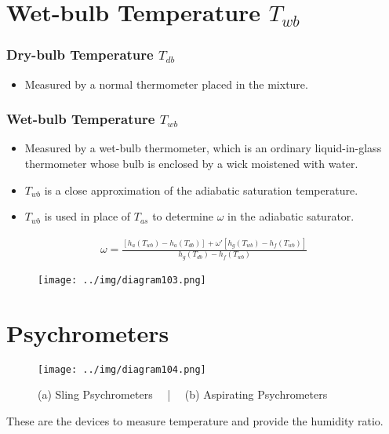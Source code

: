 \documentclass[class=report, crop=false, 12pt,a4paper]{standalone}
\numberwithin{equation}{section}
\begin{document}
\section{Wet-bulb Temperature $T_{wb}$}
\subsubsection{Dry-bulb Temperature $T_{db}$}
\begin{itemize}[noitemsep]
  \item Measured by a normal thermometer placed in the mixture.
\end{itemize}
\subsubsection{Wet-bulb Temperature $T_{wb}$}
\begin{itemize}[noitemsep]
  \item Measured by a wet-bulb thermometer, which is an ordinary liquid-in-glass thermometer whose bulb is enclosed by a wick moistened with water.
  \item $T_{wb}$ is a close approximation of the adiabatic saturation temperature.
  \item $T_{wb}$ is used in place of $T_{as}$ to determine $\omega$ in the adiabatic saturator.
\end{itemize}
\begin{gather}
  \omega = \frac{[h_a(T_{wb}) - h_a(T_{db})] + \omega'[h_g(T_{wb}) - h_f(T_{wb})]}{h_g(T_{db}) - h_f(T_{wb})}
\end{gather}
\begin{figure}[H]
  \centering
  \texttt{[image: ../img/diagram103.png]}
  \caption{}
\end{figure}
\section{Psychrometers}
\begin{figure}[H]
  \centering
  \texttt{[image: ../img/diagram104.png]}
  \caption{(a) Sling Psychrometers \ \ | \ \ (b) Aspirating Psychrometers}
\end{figure}
These are the devices to measure temperature and provide the humidity ratio.
\end{document}
